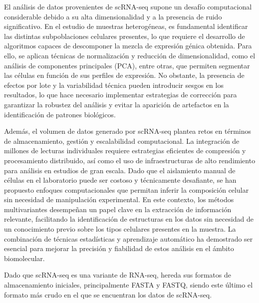 El análisis de datos provenientes de scRNA-seq supone un desafío computacional considerable debido a su alta dimensionalidad y a la presencia de ruido significativo. 
En el estudio de muestras heterogéneas, es fundamental identificar las distintas subpoblaciones celulares presentes, lo que requiere el desarrollo de algoritmos 
capaces de descomponer la mezcla de expresión génica obtenida. Para ello, se aplican técnicas de normalización y reducción de dimensionalidad, como el análisis 
de componentes principales (PCA), entre otras, que permiten segmentar las células en función de sus perfiles de 
expresión. No obstante, la presencia de efectos por lote y la variabilidad técnica pueden introducir sesgos en los resultados, lo que hace necesario implementar 
estrategias de corrección para garantizar la robustez del análisis y evitar la aparición de artefactos en la identificación de patrones biológicos. \newline

Además, el volumen de datos generado por scRNA-seq plantea retos en términos de almacenamiento, gestión y escalabilidad computacional. La integración de 
millones de lecturas individuales requiere estrategias eficientes de compresión y procesamiento distribuido, así como el uso de infraestructuras de alto 
rendimiento para análisis en estudios de gran escala. Dado que el aislamiento manual de células en el laboratorio puede ser costoso y técnicamente desafiante, 
se han propuesto enfoques computacionales que permitan inferir la composición celular sin necesidad de manipulación experimental. En este contexto, 
los métodos multivariantes desempeñan un papel clave en la extracción de información relevante, facilitando la identificación de estructuras en los datos 
sin necesidad de un conocimiento previo sobre los tipos celulares presentes en la muestra. La combinación de técnicas estadísticas y aprendizaje automático 
ha demostrado ser esencial para mejorar la precisión y fiabilidad de estos análisis en el ámbito biomolecular. \newline


Dado que scRNA-seq es una variante de RNA-seq, hereda sus formatos de almacenamiento iniciales, principalmente FASTA y FASTQ, siendo este último el formato 
más crudo en el que se encuentran los datos de scRNA-seq. %
